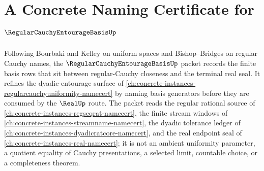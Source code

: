 \chapter{A Concrete Naming Certificate for $\RegularCauchyEntourageBasisUp$}
\label{ch:concrete-instances-regular-cauchy-entourage-basis-namecert}

Following Bourbaki and Kelley on uniform spaces and Bishop--Bridges on regular Cauchy names, the $\RegularCauchyEntourageBasisUp$ packet records the finite basis rows that sit between regular-Cauchy closeness and the terminal real seal. It refines the dyadic-entourage surface of \autoref{ch:concrete-instances-regularcauchyuniformity-namecert} by naming basis generators before they are consumed by the $\RealUp$ route. The packet reads the regular rational source of \autoref{ch:concrete-instances-regseqrat-namecert}, the finite stream windows of \autoref{ch:concrete-instances-streamname-namecert}, the dyadic tolerance ledger of \autoref{ch:concrete-instances-dyadicratcore-namecert}, and the real endpoint seal of \autoref{ch:concrete-instances-real-namecert}; it is not an ambient uniformity parameter, a quotient equality of Cauchy presentations, a selected limit, countable choice, or a completeness theorem.


